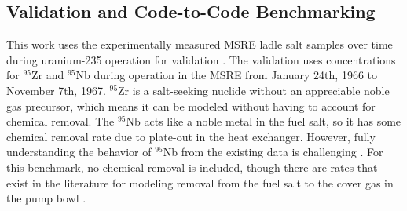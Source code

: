 \documentclass{style/nseJournal}
\begin{document}

\subsection{Validation and Code-to-Code Benchmarking}

This work uses the experimentally measured MSRE ladle salt samples over time during uranium-235 operation for validation \cite{compere1975fission}.
The validation uses concentrations for $^{95}$Zr and $^{95}$Nb during operation in the MSRE from January 24th, 1966 to November 7th, 1967.
$^{95}$Zr is a salt-seeking nuclide without an appreciable noble gas precursor, which means it can be modeled without having to account for chemical removal.
The $^{95}$Nb acts like a noble metal in the fuel salt, so it has some chemical removal rate due to plate-out in the heat exchanger.
However, fully understanding the behavior of $^{95}$Nb from the existing data is challenging \cite{cheng2021distribution}.
For this benchmark, no chemical removal is included, though there are rates that exist in the literature for modeling removal from the fuel salt to the cover gas in the pump bowl \cite{shahbazi2024modeling}.
\end{document}
